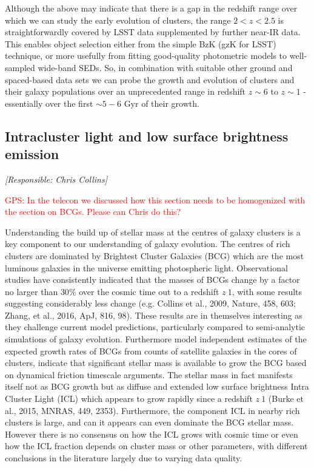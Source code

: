 \documentclass[a4paper,11pt]{article}
\newcommand{\red}{\textcolor{red}}
\begin{document}
Although the above may indicate that there is a gap in the redshift
range over which we can study the early evolution of clusters, the
range $2<z<2.5$ is straightforwardly covered by LSST data supplemented
by further near-IR data. This enables object selection either from the
simple BzK (gzK for LSST) technique, or more usefully from fitting
good-quality photometric models to well-sampled wide-band SEDs. So, in
combination with suitable other ground and spaced-based data sets we
can probe the growth and evolution of clusters and their galaxy
populations over an unprecedented range in redshift $z\sim 6$ to
$z\sim 1$ - essentially over the first $\sim5-6$ Gyr of their growth.

\subsection{Intracluster light and low surface brightness emission} \label{sec:lsb}

{\it [Responsible: Chris Collins]}

\noindent\red{GPS: In the telecon we discussed how this section needs
  to be homogenized with the section on BCGs.  Please can Chris do
  this?}

\noindent
Understanding the build up of stellar mass at the centres of galaxy
clusters is a key component to our understanding of galaxy
evolution. The centres of rich clusters are dominated by Brightest
Cluster Galaxies (BCG) which are the most luminous galaxies in the
universe emitting photospheric light. Observational studies have
consistently indicated that the masses of BCGs change by a factor no
larger than $30\%$ over the cosmic time out to a redshift $ z~1$, with
some results suggesting considerably less change (e.g. Collins et al.,
2009, Nature, 458, 603; Zhang, et al., 2016, ApJ, 816, 98). These
results are in themselves interesting as they challenge current model
predictions, particularly compared to semi-analytic simulations of
galaxy evolution. Furthermore model independent estimates of the
expected growth rates of BCGs from counts of satellite galaxies in the
cores of clusters, indicate that significant stellar mass is available
to grow the BCG based on dynamical friction timescale arguments. The
stellar mass in fact manifests itself not as BCG growth but as diffuse
and extended low surface brightness Intra Cluster Light (ICL) which
appears to grow rapidly since a redshift $z~1$ (Burke et al., 2015,
MNRAS, 449, 2353). Furthermore, the component ICL in nearby rich
clusters is large, and can it appears can even dominate the BCG
stellar mass. However there is no consensus on how the ICL grows with
cosmic time or even how the ICL fraction depends on cluster mass or
other parameters, with different conclusions in the literature largely
due to varying data quality.
\end{document}
